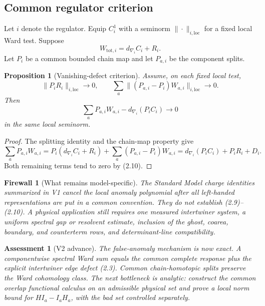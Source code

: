 \documentclass[11pt]{article}
\newtheorem{proposition}[theorem]{Proposition}
\newtheorem{assessment}[theorem]{Assessment}
\newtheorem{firewall}[theorem]{Firewall}
\begin{document}
\subsection{Common regulator criterion}

Let \(i\) denote the regulator.  Equip \(C_i^1\) with a seminorm
\(\|\cdot\|_{i,\mathrm{loc}}\) for a fixed local Ward test.  Suppose
\[
 W_{\mathrm{tot},i}=d_{\nabla_i}C_i+R_i.
 \tag{2.9}
\]
Let \(P_i\) be a common bounded chain map and let \(P_{a,i}\) be the
component splits.

\begin{proposition}[Vanishing-defect criterion]
\label{prop:v11v2-vanishing}
Assume, on each fixed local test,
\[
 \|P_iR_i\|_{i,\mathrm{loc}}\longrightarrow0,
 \qquad
 \sum_a\|(P_{a,i}-P_i)W_{a,i}\|_{i,\mathrm{loc}}
 \longrightarrow0.
 \tag{2.10}
\]
Then
\[
 \sum_aP_{a,i}W_{a,i}
 -
 d_{\nabla_i}(P_iC_i)
 \longrightarrow0
 \tag{2.11}
\]
in the same local seminorm.
\end{proposition}

\begin{proof}
The splitting identity and the chain-map property give
\[
 \sum_aP_{a,i}W_{a,i}
 =
 P_i(d_{\nabla_i}C_i+R_i)
 +\sum_a(P_{a,i}-P_i)W_{a,i}
 =
 d_{\nabla_i}(P_iC_i)+P_iR_i+D_i.
\]
Both remaining terms tend to zero by (2.10).
\end{proof}

\begin{firewall}[What remains model-specific]
\label{fw:v11v2-model}
The Standard Model charge identities summarized in V1 cancel the local
anomaly polynomial after all left-handed representations are put in a
common convention.  They do not establish (2.9)--(2.10).  A physical
application still requires one measured intertwiner system, a uniform
spectral gap or resolvent estimate, inclusion of the ghost, coarea,
boundary, and counterterm rows, and determinant-line compatibility.
\end{firewall}

\begin{assessment}[V2 advance]
\label{ass:v11v2}
The false-anomaly mechanism is now exact.  A componentwise spectral Ward
sum equals the common complete response plus the explicit intertwiner edge
defect (2.3).  Common chain-homotopic splits preserve the Ward cohomology
class.  The next bottleneck is analytic: construct the common overlap
functional calculus on an admissible physical set and prove a local norm
bound for \(HI_a-I_aH_a\), with the bad set controlled separately.
\end{assessment}
\end{document}
